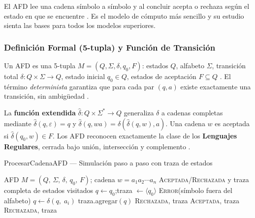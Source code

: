 El AFD lee una cadena símbolo a símbolo y al concluir acepta o rechaza según el estado en que se
encuentre \cite{sipser2012}. Es el modelo de cómputo más sencillo y su estudio sienta las bases
para todos los modelos superiores.

\subsubsection*{Definición Formal (5-tupla) y Función de Transición}

Un AFD es una 5-tupla $M = (Q, \Sigma, \delta, q_0, F)$: estados $Q$, alfabeto $\Sigma$,
transición total $\delta: Q \times \Sigma \to Q$, estado inicial $q_0 \in Q$, estados de
aceptación $F \subseteq Q$ \cite{hopcroft2007es}. El término \emph{determinista} garantiza que
para cada par $(q, a)$ existe exactamente una transición, sin ambigüedad \cite{kelley2001}.

La \textbf{función extendida} $\hat\delta: Q \times \Sigma^* \to Q$ generaliza $\delta$ a cadenas
completas mediante $\hat\delta(q,\varepsilon)=q$ y $\hat\delta(q, wa) = \delta(\hat\delta(q,w), a)$.
Una cadena $w$ es aceptada si $\hat\delta(q_0, w) \in F$. Los AFD reconocen exactamente la clase
de los \textbf{Lenguajes Regulares}, cerrada bajo unión, intersección y complemento \cite{hopcroft2007}.

\begin{algobox}{ProcesarCadenaAFD — Simulación paso a paso con traza de estados}
\begin{algorithmic}[1]
  \Require AFD $M = (Q,\,\Sigma,\,\delta,\,q_0,\,F)$;\; cadena $w = a_1 a_2 \cdots a_n$
  \Ensure  \textsc{Aceptada}/\textsc{Rechazada} y traza completa de estados visitados
  \State
  \State $q \gets q_0$;\quad traza $\gets \langle q_0 \rangle$
      \State \Return \textsc{Error}(\textquotedbl{}símbolo fuera del alfabeto\textquotedbl{})
    \EndIf
    \State $q \gets \delta(q,\; a_i)$ 
    \State traza.agregar$(q)$
     
      \State \Return \textsc{Rechazada}, traza
    \EndIf
  \EndFor
  \State
    \State \Return \textsc{Aceptada}, traza
  \Else
    \State \Return \textsc{Rechazada}, traza
  \EndIf
  \State {}
\end{algorithmic}
\end{algobox}

